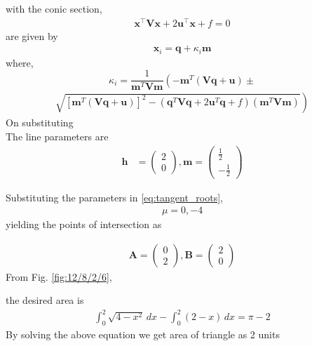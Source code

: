 \documentclass[journal,12pt,twocolumn]{IEEEtran}
\let\vec\mathbf
\newcommand{\myvec}[1]{\ensuremath{\begin{pmatrix}#1\end{pmatrix}}}
\providecommand{\brak}[1]{\ensuremath{\left(#1\right)}}
\providecommand{\lbrak}[1]{\ensuremath{\left(#1\right.}}
\providecommand{\rbrak}[1]{\ensuremath{\left.#1\right)}}
\providecommand{\sbrak}[1]{\ensuremath{{}\left[#1\right]}}
\begin{document}
with the conic section, \\ 
\begin{align}
	\vec{x}^{\top}\vec{V}\vec{x} + 2\vec{u}^{\top} \vec{x} + f = 0
\end{align}
are given by \\
\begin{align}
\vec{x}_i = \vec{q} + \kappa_i \vec{m}
\end{align}
where, \\

\begin{equation*}
\kappa_i = \frac{1}
{
\vec{m}^T\vec{V}\vec{m}
}
\lbrak{-\vec{m}^T\brak{\vec{V}\vec{q}+\vec{u}}}
\pm
\end{equation*}
\begin{align}
\rbrak{\sqrt{
\sbrak{
\vec{m}^T\brak{\vec{V}\vec{q}+\vec{u}}
}^2
-
\brak
{
\vec{q}^T\vec{V}\vec{q} + 2\vec{u}^T\vec{q} +f
}
\brak{\vec{m}^T\vec{V}\vec{m}}
}
}
\end{align}
On substituting\\
\fi
The line parameters are
\begin{align}
\vec{h} &= \myvec{
2\\
0
}, 
\vec{m} = \myvec{\frac{1}{2} \\ -\frac{1}{2}}
\end{align}

Substituting the parameters in \eqref{eq:tangent_roots},
\begin{align}
\mu =0,-4
\end{align}
yielding the points of intersection as

\begin{align}
    \vec{A}=\myvec{
0\\
2
    },
    \vec{B}=\myvec{
2\\
0
    }
\end{align}
From Fig. 
		\ref{fig:12/8/2/6},

the desired area is
\begin{align}
\int_{0}^{2}\sqrt{4-x^2} \,dx 
-\int_{0}^{2} (2-x) \,dx
=\pi - 2
\end{align}
\iffalse
By solving the above equation we get area of triangle as 2 units
\end{document}
